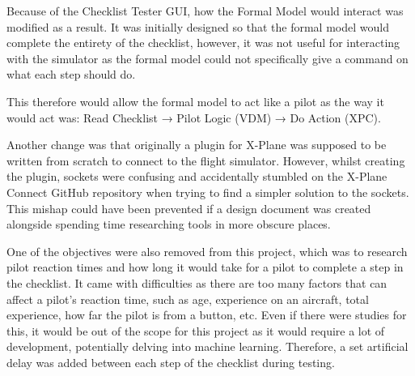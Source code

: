 \documentclass[../dissertation.tex]{subfiles}
\begin{document}
Because of the Checklist Tester GUI, how the Formal Model would interact was modified as a result.
It was initially designed so that the formal model would complete the entirety of the checklist,
however, it was not useful for interacting with the simulator as the formal model could not
specifically give a command on what each step should do.

This therefore would allow the formal model to act like a pilot as the way it would act was:
Read Checklist → Pilot Logic (VDM) → Do Action (XPC).

Another change was that originally a plugin for X-Plane was supposed to be written from
scratch to connect to the flight simulator. However, whilst creating the plugin, sockets
were confusing and accidentally stumbled on the X-Plane Connect GitHub repository when trying
to find a simpler solution to the sockets. This mishap could have been prevented if a design
document was created alongside spending time researching tools in more obscure places.

One of the objectives were also removed from this project, which was to research
pilot reaction times and how long it would take for a pilot to complete a step in the
checklist. It came with difficulties as there are too many factors that can affect a
pilot's reaction time, such as age, experience on an aircraft, total experience,
how far the pilot is from a button, etc. Even if there were studies for this, it would be
out of the scope for this project as it would require a lot of development, potentially
delving into machine learning. Therefore, a set artificial delay was added between each
step of the checklist during testing.

\end{document}
